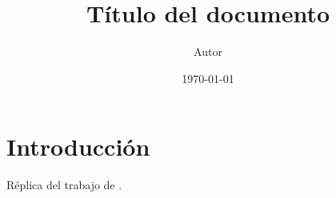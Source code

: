 \documentclass[11pt,a4paper]{article}
\title{T\'itulo del documento}
\author{Autor}
\date{\today}
\begin{document}
\maketitle

\section{Introducci\'on}
R\'eplica del trabajo de \textcite{basso2026}.


\printbibliography
\end{document}
